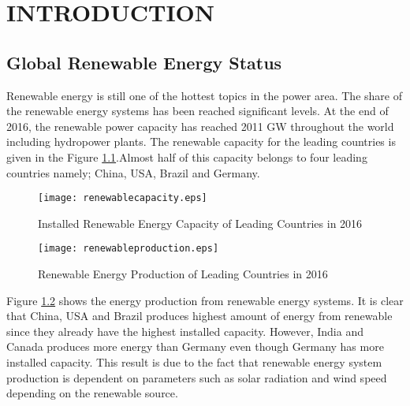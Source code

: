 \chapter{INTRODUCTION}
\label{chp:1}

\section{Global Renewable Energy Status}
Renewable energy is still one of the hottest topics in the power area. The share of the renewable energy systems has been reached significant levels. At the end of 2016, the renewable power capacity has reached 2011 GW throughout the world including hydropower plants.\cite{InternationalRenewableEnergyAgency2017}  The renewable capacity for the leading countries is given in the Figure \ref{renewablecap}.Almost half of this capacity belongs to four leading countries namely; China, USA, Brazil and Germany. \par
\begin{figure}[h!]
	\centering
	\texttt{[image: renewablecapacity.eps]}
	\caption{Installed Renewable Energy Capacity of Leading Countries in 2016\cite{InternationalRenewableEnergyAgency2017}}
	\label{renewablecap}
\end{figure}
\begin{figure}[h!]
	\centering
	\texttt{[image: renewableproduction.eps]}
	\caption{Renewable Energy Production of Leading Countries in 2016 \cite{InternationalRenewableEnergyAgency2017}}
	\label{renewablepro}
\end{figure}
Figure \ref{renewablepro} shows the energy production from renewable energy systems. It is clear that China, USA and Brazil produces highest amount of energy from renewable since they already have the highest installed capacity. However, India and Canada produces more energy than Germany even though Germany has more installed capacity. This result is due to the fact that renewable energy system production is dependent on parameters such as solar radiation and wind speed depending on the renewable source.
